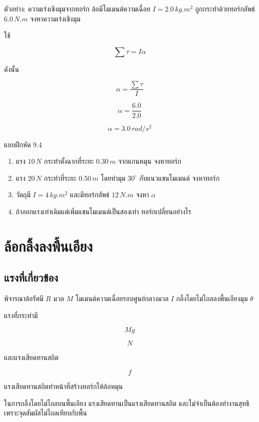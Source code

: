 \begin{examplebox}{ตัวอย่าง: ความเร่งเชิงมุมจากทอร์ก}
ล้อมีโมเมนต์ความเฉื่อย $I=2.0\,\si{kg.m^2}$ ถูกกระทำด้วยทอร์กลัพธ์ $6.0\,\si{N.m}$ จงหาความเร่งเชิงมุม

ใช้

\[
\sum\tau=I\alpha
\]

ดังนั้น

\[
\alpha=\frac{\sum\tau}{I}
\]

\[
\alpha=\frac{6.0}{2.0}
\]

\[
\boxed{\alpha=3.0\,\si{rad/s^2}}
\]
\end{examplebox}

\begin{exercisebox}{แบบฝึกหัด 9.4}
\begin{enumerate}
    \item แรง $10\,\si{N}$ กระทำตั้งฉากที่ระยะ $0.30\,\si{m}$ จากแกนหมุน จงหาทอร์ก
    \item แรง $20\,\si{N}$ กระทำที่ระยะ $0.50\,\si{m}$ โดยทำมุม $30^\circ$ กับแนวแขนโมเมนต์ จงหาทอร์ก
    \item วัตถุมี $I=4\,\si{kg.m^2}$ และมีทอร์กลัพธ์ $12\,\si{N.m}$ จงหา $\alpha$
    \item ถ้าออกแรงเท่าเดิมแต่เพิ่มแขนโมเมนต์เป็นสองเท่า ทอร์กเปลี่ยนอย่างไร
\end{enumerate}
\end{exercisebox}

\section{ล้อกลิ้งลงพื้นเอียง}

\subsection{แรงที่เกี่ยวข้อง}

พิจารณาล้อรัศมี $R$ มวล $M$ โมเมนต์ความเฉื่อยรอบศูนย์กลางมวล $I$ กลิ้งโดยไม่ไถลลงพื้นเอียงมุม $\theta$

แรงที่กระทำมี

\[
Mg
\]

\[
N
\]

และแรงเสียดทานสถิต

\[
f
\]

แรงเสียดทานสถิตทำหน้าที่สร้างทอร์กให้ล้อหมุน

\begin{tcolorbox}[title=ข้อควรจำ]
ในการกลิ้งโดยไม่ไถลบนพื้นเอียง แรงเสียดทานเป็นแรงเสียดทานสถิต และไม่จำเป็นต้องทำงานสุทธิ เพราะจุดสัมผัสไม่ไถลเทียบกับพื้น
\end{tcolorbox}

